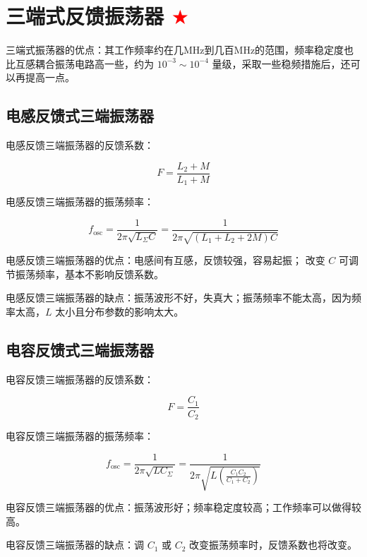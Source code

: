\section{三端式反馈振荡器 \textcolor{red}{$\bigstar$}}

三端式振荡器的优点：其工作频率约在几MHz到几百MHz的范围，频率稳定度也比互感耦合振荡电路高一些，约为 $10^{-3} \sim 10^{-4}$ 量级，采取一些稳频措施后，还可以再提高一点。

\subsection{电感反馈式三端振荡器}

电感反馈三端振荡器的反馈系数：

\begin{equation}
    F = \frac{L_2 + M}{L_1 + M}
\end{equation}

电感反馈三端振荡器的振荡频率：

\begin{equation}
    f_{\text{osc}} = \frac{1}{2 \pi \sqrt{L_{\Sigma} C}}
    = \frac{1}{2 \pi \sqrt{(L_1 + L_2 + 2M) C}}
\end{equation}

电感反馈三端振荡器的优点：电感间有互感，反馈较强，容易起振；
改变 $C$ 可调节振荡频率，基本不影响反馈系数。

电感反馈三端振荡器的缺点：振荡波形不好，失真大；振荡频率不能太高，因为频率太高，$L$ 太小且分布参数的影响太大。

\subsection{电容反馈式三端振荡器}

电容反馈三端振荡器的反馈系数：

\begin{equation}
    F = \frac{C_1}{C_2}
\end{equation}

电容反馈三端振荡器的振荡频率：

\begin{equation}
    f_{\text{osc}} = \frac{1}{2 \pi \sqrt{L C_{\Sigma}}}
    = \frac{1}{2 \pi \sqrt{L \left(\frac{C_1 C_2}{C_1 + C_2}\right)}}
\end{equation}

电容反馈三端振荡器的优点：振荡波形好；频率稳定度较高；工作频率可以做得较高。

电容反馈三端振荡器的缺点：调 $C_1$ 或 $C_2$ 改变振荡频率时，反馈系数也将改变。

